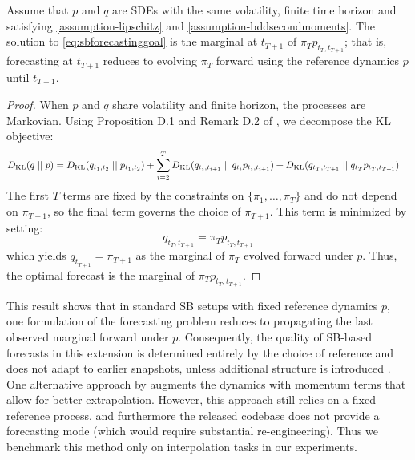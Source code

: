 \begin{proposition}
\label{prop:sb-forecasting}
Assume that $p$ and $q$ are SDEs with the same volatility, finite time horizon and satisfying \cref{assumption-lipschitz} and \cref{assumption-bddsecondmoments}. The solution to \eqref{eq:sbforecastinggoal} is the marginal at $t_{T+1}$ of $\pi_T p_{t_T, t_{T+1}}$; that is, forecasting at $t_{T+1}$ reduces to evolving $\pi_T$ forward using the reference dynamics $p$ until $t_{T+1}$.
\end{proposition}

\begin{proof}
When $p$ and $q$ share volatility and finite horizon, the processes are Markovian. Using Proposition D.1 and Remark D.2 of \citet{Lavenant2021}, we decompose the KL objective:
\begin{align}
    D_{\mathrm{KL}}(q \mid\mid p) &= D_{\mathrm{KL}}(q_{t_1, t_2} \mid\mid p_{t_1, t_2})
    + \sum_{i=2}^{T} D_{\mathrm{KL}}(q_{t_i, t_{i+1}} \mid\mid q_{t_i} p_{t_i, t_{i+1}})
    + D_{\mathrm{KL}}(q_{t_T, t_{T+1}} \mid\mid q_{t_T} p_{t_T, t_{T+1}})
\end{align}
The first $T$ terms are fixed by the constraints on $\{\pi_1, \dots, \pi_T\}$ and do not depend on $\pi_{T+1}$, so the final term governs the choice of $\pi_{T+1}$. This term is minimized by setting:
\begin{equation}
    q_{t_T, t_{T+1}} = \pi_T p_{t_T, t_{T+1}}
\end{equation}
which yields $q_{t_{T+1}} = \pi_{T+1}$ as the marginal of $\pi_T$ evolved forward under $p$. Thus, the optimal forecast is the marginal of $\pi_T p_{t_T, t_{T+1}}$.
\end{proof}

This result shows that in standard SB setups with fixed reference dynamics $p$, one formulation of the forecasting problem reduces to propagating the last observed marginal forward under $p$. Consequently, the quality of SB-based forecasts in this extension is determined entirely by the choice of reference and does not adapt to earlier snapshots, unless additional structure is introduced \citep[e.g.,][]{shen2024multi}. One alternative approach by \citet{chen2024deep} augments the dynamics with momentum terms that allow for better extrapolation. However, this approach still relies on a fixed reference process, and furthermore the released codebase does not provide a forecasting mode (which would require substantial re-engineering). Thus we benchmark this method only on interpolation tasks in our experiments.

